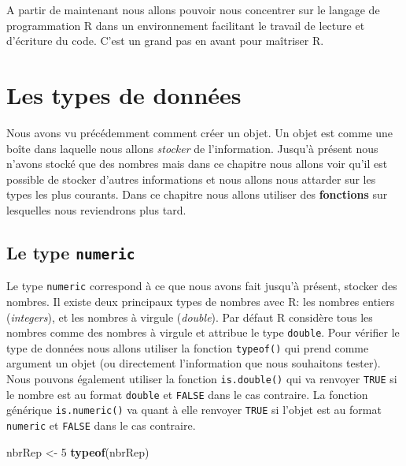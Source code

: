 \documentclass[
]{book}
\newenvironment{Shaded}{\begin{snugshade}}{\end{snugshade}}
\newcommand{\DecValTok}[1]{\textcolor[rgb]{0.00,0.00,0.81}{#1}}
\newcommand{\KeywordTok}[1]{\textcolor[rgb]{0.13,0.29,0.53}{\textbf{#1}}}
\newcommand{\NormalTok}[1]{#1}
\newcommand{\StringTok}[1]{\textcolor[rgb]{0.31,0.60,0.02}{#1}}
\begin{document}
A partir de maintenant nous allons pouvoir nous concentrer sur le langage de programmation R dans un environnement facilitant le travail de lecture et d'écriture du code. C'est un grand pas en avant pour maîtriser R.

\hypertarget{dataType1}{%
\chapter{Les types de données}\label{dataType1}}

Nous avons vu précédemment comment créer un objet. Un objet est comme une boîte dans laquelle nous allons \emph{stocker} de l'information. Jusqu'à présent nous n'avons stocké que des nombres mais dans ce chapitre nous allons voir qu'il est possible de stocker d'autres informations et nous allons nous attarder sur les types les plus courants. Dans ce chapitre nous allons utiliser des \textbf{fonctions} sur lesquelles nous reviendrons plus tard.

\hypertarget{le-type-numeric}{%
\section{\texorpdfstring{Le type \texttt{numeric}}{Le type numeric}}\label{le-type-numeric}}

Le type \texttt{numeric} correspond à ce que nous avons fait jusqu'à présent, stocker des nombres. Il existe deux principaux types de nombres avec R: les nombres entiers (\emph{integers}), et les nombres à virgule (\emph{double}). Par défaut R considère tous les nombres comme des nombres à virgule et attribue le type \texttt{double}.
Pour vérifier le type de données nous allons utiliser la fonction \texttt{typeof()} qui prend comme argument un objet (ou directement l'information que nous souhaitons tester). Nous pouvons également utiliser la fonction \texttt{is.double()} qui va renvoyer \texttt{TRUE} si le nombre est au format \texttt{double} et \texttt{FALSE} dans le cas contraire. La fonction générique \texttt{is.numeric()} va quant à elle renvoyer \texttt{TRUE} si l'objet est au format \texttt{numeric} et \texttt{FALSE} dans le cas contraire.

\begin{Shaded}
\begin{Highlighting}[]
\NormalTok{nbrRep <-}\StringTok{ }\DecValTok{5}
\KeywordTok{typeof}\NormalTok{(nbrRep)}
\end{Highlighting}
\end{Shaded}
\end{document}
